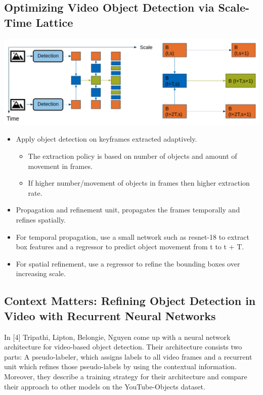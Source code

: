 \documentclass[conference]{IEEEtran}
\begin{document}
\subsection{Optimizing Video Object Detection via Scale-Time Lattice}
\includegraphics[width=\columnwidth]{scale-time-lattice}
\begin{itemize}
	\item Apply object detection on keyframes extracted adaptively.
	\begin{itemize}
		\item The extraction policy is based on number of objects and amount of movement in frames.
		\item If higher number/movement of objects in frames then higher extraction rate.
	\end{itemize}
	\item Propagation and refinement unit, propagates the frames temporally and refines spatially.
	\item For temporal propagation, use a small network such as resnet-18 to extract box features and a regressor to predict object movement from t to t + T.
	\item For spatial refinement, use a regressor to refine the bounding boxes over increasing scale.

\end{itemize}

\subsection{Context Matters: Refining Object Detection in Video with Recurrent Neural Networks}
In [4] Tripathi, Lipton, Belongie, Nguyen come up with a neural network architecture for video-based object detection. Their architecture consists two parts: A pseudo-labeler, which assigns labels to all video frames and a recurrent unit which refines those pseudo-labels by using the contextual information. Moreover, they describe a training strategy for their architecture and compare their approach to other models on the YouTube-Objects dataset. \newline
\end{document}
